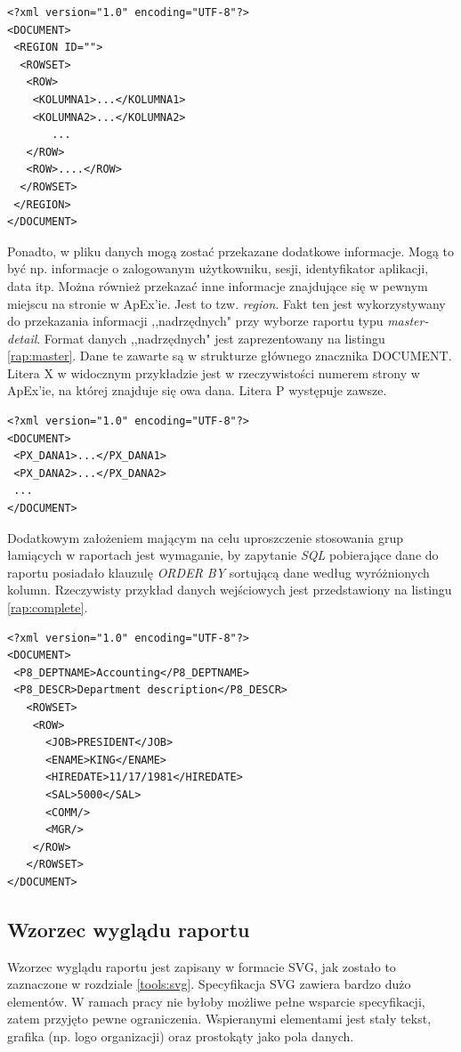 \documentclass[11pt,a4paper]{article}
\begin{document}
\lstset{language=XML}
\begin{lstlisting}[frame=single,caption=Ogólna postać dokumentu XML z danymi pochodzącymi z ApExa,label=rap:apex]
<?xml version="1.0" encoding="UTF-8"?>
<DOCUMENT>
 <REGION ID="">
  <ROWSET>
   <ROW>
    <KOLUMNA1>...</KOLUMNA1>
    <KOLUMNA2>...</KOLUMNA2>
       ...	
   </ROW>
   <ROW>....</ROW>
  </ROWSET>
 </REGION>
</DOCUMENT>
\end{lstlisting}

Ponadto, w pliku danych mogą zostać przekazane dodatkowe informacje. Mogą to być np. informacje o zalogowanym użytkowniku, sesji, identyfikator aplikacji, data itp. Można również przekazać inne informacje znajdujące się w pewnym miejscu na stronie w ApEx'ie. Jest to tzw. \emph{region}. Fakt ten jest wykorzystywany do przekazania informacji ,,nadrzędnych" przy wyborze raportu typu \emph{master-detail}. Format danych ,,nadrzędnych" jest zaprezentowany na listingu \ref{rap:master}. Dane te zawarte są w strukturze głównego znacznika DOCUMENT. Litera X w widocznym przykładzie jest w rzeczywistości numerem strony w ApEx'ie, na której znajduje się owa dana. Litera P występuje zawsze. 

\lstset{language=XML}
\begin{lstlisting}[frame=single,caption=Format danych typu \emph{master},label=rap:master]
<?xml version="1.0" encoding="UTF-8"?>
<DOCUMENT>
 <PX_DANA1>...</PX_DANA1>
 <PX_DANA2>...</PX_DANA2>
 ...
</DOCUMENT>
\end{lstlisting}

Dodatkowym założeniem mającym na celu uproszczenie stosowania grup łamiących w raportach jest wymaganie, by zapytanie \emph{SQL} pobierające dane do raportu posiadało klauzulę \emph{ORDER BY} sortującą dane według wyróżnionych kolumn. Rzeczywisty przykład danych wejściowych jest przedstawiony na listingu \ref{rap:complete}.

\lstset{language=XML}
\begin{lstlisting}[frame=single,caption=Przykładowe dane,label=rap:complete]
<?xml version="1.0" encoding="UTF-8"?>
<DOCUMENT>
 <P8_DEPTNAME>Accounting</P8_DEPTNAME>
 <P8_DESCR>Department description</P8_DESCR>
   <ROWSET>
    <ROW>
      <JOB>PRESIDENT</JOB>
      <ENAME>KING</ENAME>
      <HIREDATE>11/17/1981</HIREDATE>
      <SAL>5000</SAL>
      <COMM/>
      <MGR/>
    </ROW>
   </ROWSET>
</DOCUMENT>
\end{lstlisting}

\subsection{Wzorzec wyglądu raportu} \label{solution:layout}
Wzorzec wyglądu raportu jest zapisany w formacie SVG, jak zostało to zaznaczone w rozdziale \ref{tools:svg}. Specyfikacja SVG zawiera bardzo dużo elementów. W ramach pracy nie byłoby możliwe pełne wsparcie specyfikacji, zatem przyjęto pewne ograniczenia. Wspieranymi elementami jest stały tekst, grafika (np. logo organizacji) oraz prostokąty jako pola danych.
\end{document}

